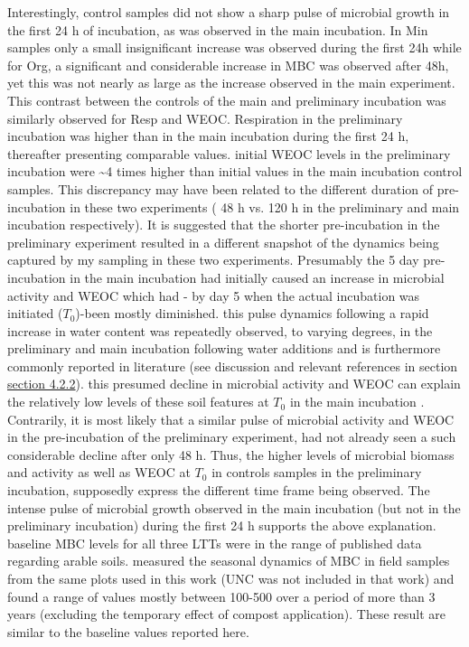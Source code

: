 \documentclass[12pt]{report}
\begin{document}
		Interestingly, control samples did not show a sharp pulse of microbial growth in the first 24 h of incubation, as was observed in the main incubation. In Min samples only a small insignificant increase was observed during the first 24h while for Org, a significant and considerable increase in MBC was observed after 48h, yet this was  not nearly as large as the increase observed in the main experiment. This contrast between the controls of the main and preliminary incubation was similarly observed for Resp and WEOC. Respiration in the preliminary incubation was higher than in the main incubation during the first 24 h, thereafter presenting comparable values. initial WEOC levels in the preliminary incubation were \~{}4 times higher than initial values in the main incubation control samples. This discrepancy may have been related to the different duration of pre-incubation in these two experiments ( 48 h vs. 120 h in the preliminary and main incubation respectively). It is suggested that the shorter pre-incubation in the preliminary experiment resulted in a different snapshot of the dynamics being captured by my sampling in these two experiments. Presumably the 5 day pre-incubation in the main incubation had initially caused an increase in microbial activity and WEOC which had - by day 5 when the actual incubation was initiated ($ T_0 $)-been mostly diminished. this pulse dynamics following a rapid increase in water content was repeatedly observed, to varying degrees, in the preliminary and main incubation following water additions and is furthermore commonly reported in literature (see discussion and relevant references in section \hyperref[subsection_4.2.2]{section 4.2.2}). this presumed decline in microbial activity and WEOC can explain the relatively low levels of these soil features at $ T_0 $ in the main incubation . Contrarily, it is most likely that a similar pulse of microbial activity and WEOC in the pre-incubation of the preliminary experiment, had not already seen a such considerable decline after only 48 h. Thus, the higher levels of microbial biomass and activity as well as WEOC at $ T_0 $ in controls samples in the preliminary incubation, supposedly express the different time frame being observed. The intense pulse of microbial growth observed in the main incubation (but not in the preliminary incubation) during the first 24 h supports the above explanation.\\
		baseline MBC levels for all three LTTs were in the range of published data regarding arable soils\citep{gonzalez-quinones2011}. \citet{rotbart2018} measured the seasonal dynamics of MBC in field samples from the same plots used in this work (UNC was not included in that work) and found a range of values mostly between 100-500 \genericunit over a period of more than 3 years (excluding the temporary effect of compost application). These result are similar to the baseline values reported here.
\end{document}
